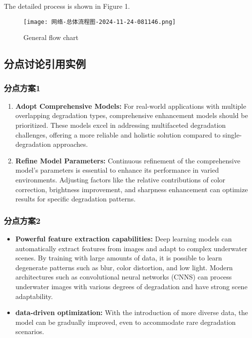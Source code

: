 \documentclass{apmcmthesis}                                             %
\begin{document}
 The detailed process is shown in Figure 1.
\begin{figure}[!th]
    \centering
    \texttt{[image: 网络-总体流程图-2024-11-24-081146.png]}
    \caption{General flow chart}
    \label{fig:enter-label}
\end{figure}












\subsection{分点讨论引用实例}
\subsubsection{分点方案1}

\begin{enumerate}
    \item \textbf{Adopt Comprehensive Models:} For real-world applications with multiple overlapping degradation types, comprehensive enhancement models should be prioritized. These models excel in addressing multifaceted degradation challenges, offering a more reliable and holistic solution compared to single-degradation approaches.
    \item \textbf{Refine Model Parameters:} Continuous refinement of the comprehensive model's parameters is essential to enhance its performance in varied environments. Adjusting factors like the relative contributions of color correction, brightness improvement, and sharpness enhancement can optimize results for specific degradation patterns.

\end{enumerate}

\subsubsection{分点方案2}
\begin{itemize}
\item \textbf{Powerful feature extraction capabilities:} Deep learning models can automatically extract features from images and adapt to complex underwater scenes. By training with large amounts of data, it is possible to learn degenerate patterns such as blur, color distortion, and low light.
Modern architectures such as convolutional neural networks (CNNS) can process underwater images with various degrees of degradation and have strong scene adaptability.
\item \textbf{data-driven optimization:} With the introduction of more diverse data, the model can be gradually improved, even to accommodate rare degradation scenarios.
\end{itemize}
\end{document}

